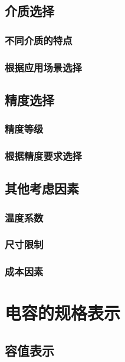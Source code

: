 \documentclass[12pt,UTF8]{ctexbook}
\begin{document}
\section{介质选择}

\subsection{不同介质的特点}

\subsection{根据应用场景选择}

\section{精度选择}

\subsection{精度等级}

\subsection{根据精度要求选择}

\section{其他考虑因素}

\subsection{温度系数}

\subsection{尺寸限制}

\subsection{成本因素}

\chapter{电容的规格表示}

\section{容值表示}
\end{document}
